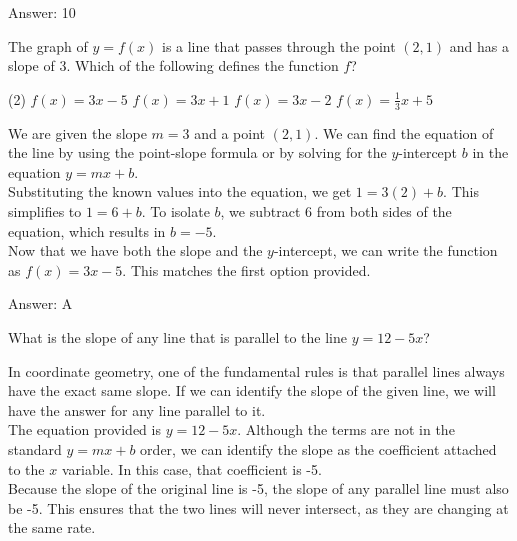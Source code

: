 \documentclass[11pt,paper=a4,answers]{exam}
\begin{document}
\begin{questions}
\begin{solution}
\vspace{15pt}
Answer: \colorbox{yellow!100}{10}
\end{solution}

\question
The graph of $y = f(x)$ is a line that passes through the point $(2, 1)$ and has a slope of 3. Which of the following defines the function $f$?
\begin{tasks}(2)
    \task $f(x) = 3x - 5$
    \task $f(x) = 3x + 1$
    \task $f(x) = 3x - 2$
    \task $f(x) = \frac{1}{3}x + 5$
\end{tasks}

\begin{solution}
We are given the slope $m = 3$ and a point $(2, 1)$. We can find the equation of the line by using the point-slope formula or by solving for the $y$-intercept $b$ in the equation $y = mx + b$.
\\[10pt]
Substituting the known values into the equation, we get $1 = 3(2) + b$. This simplifies to $1 = 6 + b$. To isolate $b$, we subtract 6 from both sides of the equation, which results in $b = -5$.
\\[10pt]
Now that we have both the slope and the $y$-intercept, we can write the function as $f(x) = 3x - 5$. This matches the first option provided.

\vspace{15pt}
Answer: \colorbox{yellow!100}{A}
\end{solution}

\question
What is the slope of any line that is parallel to the line $y = 12 - 5x$?

\begin{solution}
In coordinate geometry, one of the fundamental rules is that parallel lines always have the exact same slope. If we can identify the slope of the given line, we will have the answer for any line parallel to it.
\\[10pt]
The equation provided is $y = 12 - 5x$. Although the terms are not in the standard $y = mx + b$ order, we can identify the slope as the coefficient attached to the $x$ variable. In this case, that coefficient is -5.
\\[10pt]
Because the slope of the original line is -5, the slope of any parallel line must also be -5. This ensures that the two lines will never intersect, as they are changing at the same rate.


\end{solution}
\end{questions}
\end{document}
